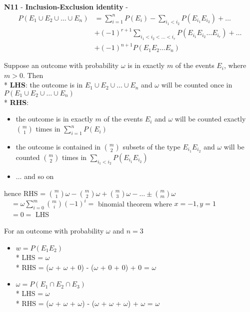 \documentclass[10pt, landscape]{article}
\begin{document}
\begin{multicols*}{3}
  \textbf{N11} - \textbf{Inclusion-Exclusion identity} - 
  \begin{align*}
    P(E_1 \cup E_2 \cup \dots \cup E_n) &= \sum\limits^n_{i=1} P(E_i) - \sum\limits_{i_1 < i_2} P(E_{i_1} E_{i_2}) + \dots \\
                                        &+ (-1)^{r+1} \sum_{i_1 < i_2 < \dots < i_r} P(E_{i_1} E_{i_2} \dots E_{i_r}) + \dots \\
                                        &+ (-1)^{n+1} P(E_1 E_2 \dots E_n)
  \end{align*}
  \begin{niceproof}
    Suppose an outcome with probability $\omega$ is in exactly $m$ of the events $E_i$, where $m > 0$. Then
    \\* \textbf{LHS}: the outcome is in $E_1\cup E_2 \cup \dots \cup E_n$ and $\omega$ will be counted once in $P(E_1\cup E_2 \cup \dots \cup E_n)$ 
    \\* \textbf{RHS}: 
    \begin{itemize}
      \item the outcome is in exactly $m$ of the events $E_i$ and $\omega$ will be counted exactly $\binom{m}{1}$ times in $\sum\limits^n_{i=1}P(E_i)$
      \item the outcome is contained in $\binom{m}{2}$ subsets of the type $E_{i_1}E_{i_2}$ 
        and $\omega$ will be counted $\binom{m}{2}$ times in $\sum\limits_{i_1 < i_2} P(E_{i_1} E_{i_2})$ 
      \item $\dots$ and so on 
    \end{itemize}
    hence RHS = $\binom{m}{1}\omega - \binom{m}{2}\omega + \binom{m}{3}\omega - \dots \pm \binom{m}{m}\omega $
    \\ $\quad = \omega \sum\limits^m_{i=0}\binom{m}{i} (-1)^i = $ binomial theorem where $x=-1, y=1$ 
    \\ $\quad = 0 = $ LHS
  \end{niceproof}
  \begin{niceproof}[e.g]
    For an outcome with probability $\omega$ and $n=3$
    \begin{itemize}
      \item 
        \begin{niceproof}[Case 1] $w = P(E_1E_2)$
          \\* LHS = $\omega$
          \\* RHS = ($\omega$ + $\omega$ + 0) - ($\omega$ + 0 + 0) + 0 = $\omega$
        \end{niceproof}
      \item 
        \begin{niceproof}[Case 2] $\omega = P(E_1 \cap E_2 \cap E_3)$
          \\* LHS = $\omega$
          \\* RHS = ($\omega$ + $\omega$ + $\omega$) - ($\omega$ + $\omega$ + $\omega$) + $\omega$ = $\omega$
        \end{niceproof}
    \end{itemize}
  \end{niceproof}


\end{multicols*}
\end{document}
